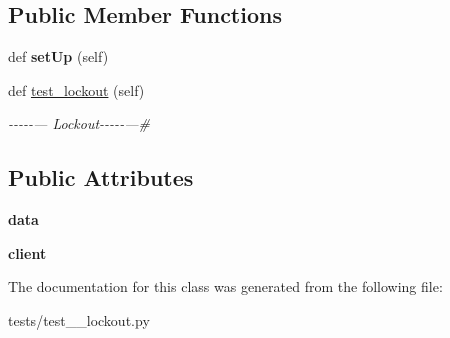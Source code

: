 \subsection*{Public Member Functions}
\begin{DoxyCompactItemize}
\item 
\mbox{\label{classtests_1_1test__6__lockout_1_1_test_user_routes_a4e710e962c8dd2899820ca7fdaea4ebf}} 
def {\bfseries set\+Up} (self)
\item 
\mbox{\label{classtests_1_1test__6__lockout_1_1_test_user_routes_ade11dacfab6d2ba02ac3b130ddbcde2a}} 
def \hyperlink{classtests_1_1test__6__lockout_1_1_test_user_routes_ade11dacfab6d2ba02ac3b130ddbcde2a}{test\+\_\+lockout} (self)
\begin{DoxyCompactList}\small\item\em -\/-\/-\/-\/-\/--- Lockout-\/-\/-\/-\/-\/---\# \end{DoxyCompactList}\end{DoxyCompactItemize}
\subsection*{Public Attributes}
\begin{DoxyCompactItemize}
\item 
\mbox{\label{classtests_1_1test__6__lockout_1_1_test_user_routes_aae07f221026b4264d83230129d1ee242}} 
{\bfseries data}
\item 
\mbox{\label{classtests_1_1test__6__lockout_1_1_test_user_routes_a385c4331e55c3ca49c15c772ac3a7847}} 
{\bfseries client}
\end{DoxyCompactItemize}


The documentation for this class was generated from the following file\+:\begin{DoxyCompactItemize}
\item 
tests/test\+\_\+\_\+lockout.\+py\end{DoxyCompactItemize}
